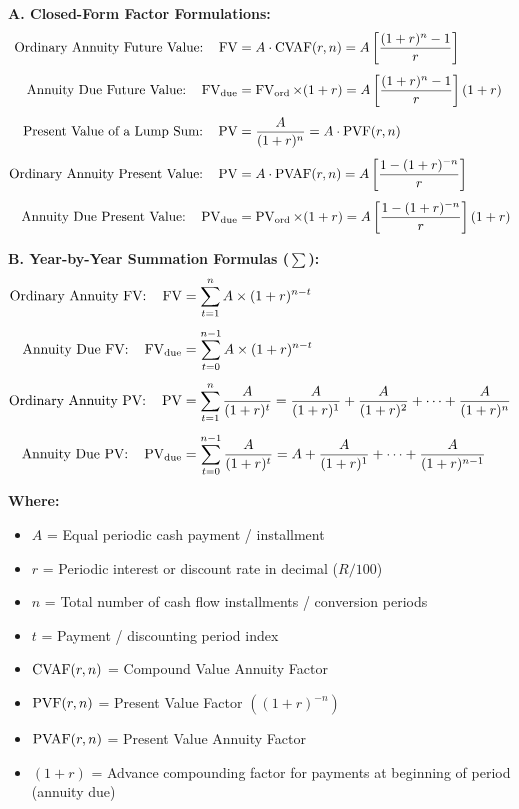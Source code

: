 \newpage
\begin{formulabox}
\textbf{A. Closed-Form Factor Formulations:}
\begin{align*}
    \text{Ordinary Annuity Future Value:} \quad \operatorname{FV} &= A \cdot \operatorname{CVAF}(r, n) = A \left[ \frac{(1 + r)^n - 1}{r} \right] \\[4pt]
    \text{Annuity Due Future Value:} \quad \operatorname{FV}_{\text{due}} &= \operatorname{FV}_{\text{ord}} \times (1 + r) = A \left[ \frac{(1 + r)^n - 1}{r} \right] (1 + r) \\[4pt]
    \text{Present Value of a Lump Sum:} \quad \operatorname{PV} &= \frac{A}{(1 + r)^n} = A \cdot \operatorname{PVF}(r, n) \\[4pt]
    \text{Ordinary Annuity Present Value:} \quad \operatorname{PV} &= A \cdot \operatorname{PVAF}(r, n) = A \left[ \frac{1 - (1 + r)^{-n}}{r} \right] \\[4pt]
    \text{Annuity Due Present Value:} \quad \operatorname{PV}_{\text{due}} &= \operatorname{PV}_{\text{ord}} \times (1 + r) = A \left[ \frac{1 - (1 + r)^{-n}}{r} \right] (1 + r)
\end{align*}

\vspace{0.2em}
\textbf{B. Year-by-Year Summation Formulas ($\sum$):}
\begin{align*}
    \text{Ordinary Annuity FV:} \quad \operatorname{FV} &= \sum_{t=1}^{n} A \times (1 + r)^{n - t} \\[4pt]
    \text{Annuity Due FV:} \quad \operatorname{FV}_{\text{due}} &= \sum_{t=0}^{n-1} A \times (1 + r)^{n - t} \\[4pt]
    \text{Ordinary Annuity PV:} \quad \operatorname{PV} &= \sum_{t=1}^{n} \frac{A}{(1 + r)^t} = \frac{A}{(1 + r)^1} + \frac{A}{(1 + r)^2} + \dots + \frac{A}{(1 + r)^n} \\[4pt]
    \text{Annuity Due PV:} \quad \operatorname{PV}_{\text{due}} &= \sum_{t=0}^{n-1} \frac{A}{(1 + r)^t} = A + \frac{A}{(1 + r)^1} + \dots + \frac{A}{(1 + r)^{n-1}}
\end{align*}

\textbf{Where:}
\begin{itemize}[noitemsep, topsep=2pt]
    \item $A$ = Equal periodic cash payment / installment
    \item $r$ = Periodic interest or discount rate in decimal ($R/100$)
    \item $n$ = Total number of cash flow installments / conversion periods
    \item $t$ = Payment / discounting period index
    \item $\operatorname{CVAF}(r, n)$ = Compound Value Annuity Factor
    \item $\operatorname{PVF}(r, n)$ = Present Value Factor $\left((1 + r)^{-n}\right)$
    \item $\operatorname{PVAF}(r, n)$ = Present Value Annuity Factor
    \item $(1 + r)$ = Advance compounding factor for payments at beginning of period (annuity due)
\end{itemize}
\end{formulabox}

